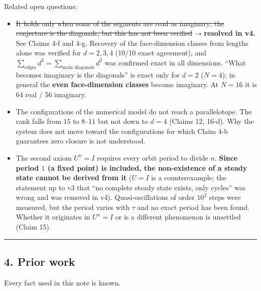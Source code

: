\documentclass[
  10pt,
]{article}
\providecommand{\tightlist}{%
  \setlength{\itemsep}{0pt}\setlength{\parskip}{0pt}}
\begin{document}
Related open questions:

\begin{itemize}
\tightlist
\item
  \st{It holds only when some of the segments are read as imaginary; the
  conjecture is the diagonals, but this has not been verified} →
  \textbf{resolved in v4.} See Claims 4-f and 4-g. Recovery of the
  face-dimension classes from lengths alone was verified for \(d=2,3,4\)
  (10/10 exact agreement), and
  \(\sum_{\text{edges}}d^2 = \sum_{\text{main diagonals}}d^2\) was
  confirmed exact in all dimensions. ``What becomes imaginary is the
  diagonals'' is exact only for \(d=2\) (\(N=4\)); in general the
  \textbf{even face-dimension classes} become imaginary. At \(N=16\) it
  is 64 real / 56 imaginary.
\item
  The configurations of the numerical model do not reach a
  parallelotope. The rank falls from \(15\) to \(8\)--\(11\) but not
  down to \(d=4\) (Claims 12, 16-d). Why the system does not move toward
  the configurations for which Claim 4-b guarantees zero closure is not
  understood.
\item
  The second axiom \(U^n=I\) requires every orbit period to divide
  \(n\). \textbf{Since period \(1\) (a fixed point) is included, the
  non-existence of a steady state cannot be derived from it} (\(U=I\) is
  a counterexample; the statement up to v3 that ``no complete steady
  state exists, only cycles'' was wrong and was removed in v4).
  Quasi-oscillations of order \(10^2\) steps were measured, but the
  period varies with \(\tau\) and no exact period has been found.
  Whether it originates in \(U^n=I\) or is a different phenomenon is
  unsettled (Claim 15).
\end{itemize}

\begin{center}\rule{0.5\linewidth}{0.5pt}\end{center}

\subsection{4. Prior work}\label{prior-work}

Every fact used in this note is known.
\end{document}
